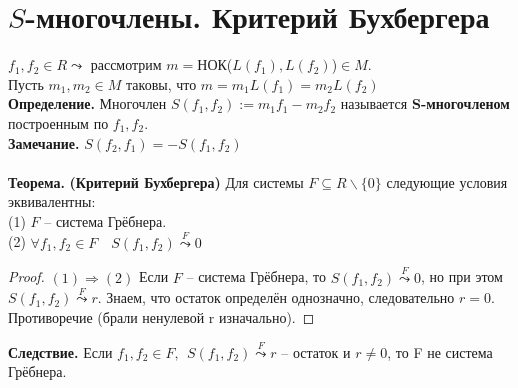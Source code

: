 \section{$S$-многочлены. Критерий Бухбергера}

$f_1,f_2\in R\leadsto $ рассмотрим $m=$НОК($L(f_1),L(f_2)$)$\in M$.\\
Пусть $m_1, m_2\in M$ таковы, что $m=m_1L(f_1)=m_2L(f_2)$\\
\textbf{Определение.} Многочлен $S(f_1,f_2):=m_1f_1-m_2f_2$ называется \textbf{S-многочленом} построенным по $f_1,f_2$.\\
\textbf{Замечание.} $S(f_2,f_1)=-S(f_1,f_2)$\\\\
\textbf{Теорема.} \textbf{(Критерий Бухбергера)} Для системы $F\subseteq R\backslash\{0\}$ следующие условия эквивалентны:\\
\indent (1) $F$ -- система Грёбнера.\\
\indent (2) $\forall f_1,f_2\in F\quad S(f_1,f_2)\overset{F}{\leadsto}0$\\
\begin{proof}
    $(1) \Rightarrow (2)$ Если $F$ -- система Грёбнера, то $S(f_1,f_2)\overset{F}{\leadsto}0$, но при этом\\ $S(f_1,f_2)\overset{F}{\leadsto}r$. Знаем, что остаток определён однозначно, следовательно $r=0$. Противоречие (брали ненулевой r изначально).
\end{proof}
\noindent\textbf{Следствие.} Если $f_1,f_2\in F, \ \ S(f_1,f_2)\overset{F}{\leadsto}r$ -- остаток и $r\neq 0$, то F не система Грёбнера.\\
